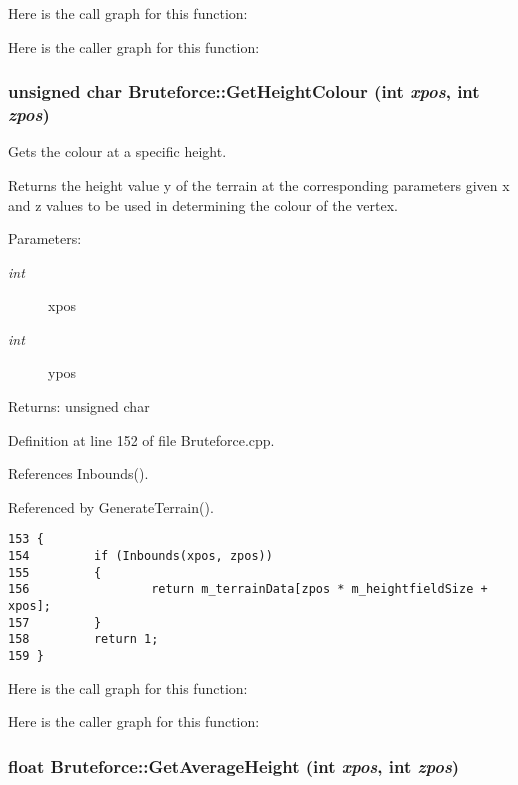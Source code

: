 Here is the call graph for this function:

Here is the caller graph for this function:\hypertarget{class_bruteforce_05513f5064029203a0096d14147ad721}{
\subsubsection[GetHeightColour]{\setlength{\rightskip}{0pt plus 5cm}unsigned char Bruteforce::GetHeightColour (int {\em xpos}, \/  int {\em zpos})}}
\label{class_bruteforce_05513f5064029203a0096d14147ad721}


Gets the colour at a specific height. 

Returns the height value y of the terrain at the corresponding parameters given x and z values to be used in determining the colour of the vertex.

\begin{Desc}
\item[Parameters:]
\begin{description}
\item[{\em int}]xpos \item[{\em int}]ypos \end{description}
\end{Desc}
\begin{Desc}
\item[Returns:]unsigned char \end{Desc}


Definition at line 152 of file Bruteforce.cpp.

References Inbounds().

Referenced by GenerateTerrain().

\begin{Code}\begin{verbatim}153 {
154         if (Inbounds(xpos, zpos))
155         {
156                 return m_terrainData[zpos * m_heightfieldSize + xpos];
157         }
158         return 1;
159 }
\end{verbatim}
\end{Code}




Here is the call graph for this function:

Here is the caller graph for this function:\hypertarget{class_bruteforce_3919323bbf5e4dbcef81c4a929fb8254}{
\subsubsection[GetAverageHeight]{\setlength{\rightskip}{0pt plus 5cm}float Bruteforce::GetAverageHeight (int {\em xpos}, \/  int {\em zpos})}}
\label{class_bruteforce_3919323bbf5e4dbcef81c4a929fb8254}


